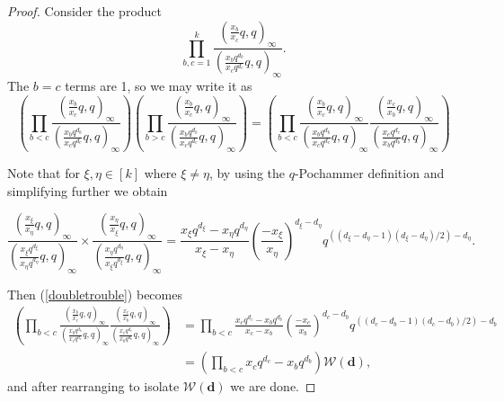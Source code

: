 \documentclass[12pt]{article}
\theoremstyle{plain}
\theoremstyle{definition}
\begin{document}
\begin{proof}
Consider the product
$$\prod_{b,c=1}^k\frac{\left(\frac{x_b}{x_c}q, q \right)_\infty}{\left(\frac{x_bq^{d_b}}{x_cq^{d_c}}q,q\right)_\infty}.$$
The $b=c$ terms are 1, so we may write it as 
\begin{equation}\label{doubletrouble}
    \left(\prod_{b<c} \frac{\left(\frac{x_b}{x_c}q, q \right)_\infty}{\left(\frac{x_bq^{d_b}}{x_cq^{d_c}}q,q\right)_\infty}\right)\left(\prod_{b>c} \frac{\left(\frac{x_b}{x_c}q, q \right)_\infty}{\left(\frac{x_bq^{d_b}}{x_cq^{d_c}}q,q\right)_\infty}\right)=\left(\prod_{b<c} \frac{\left(\frac{x_b}{x_c}q, q \right)_\infty}{\left(\frac{x_bq^{d_b}}{x_cq^{d_c}}q,q\right)_\infty}\frac{\left(\frac{x_c}{x_b}q, q \right)_\infty}{\left(\frac{x_cq^{d_c}}{x_bq^{d_b}}q,q\right)_\infty}\right)
    \end{equation}

Note that for $\xi,\eta \in [k]$ where $\xi \neq \eta$, by using the $q$-Pochammer definition and simplifying further we obtain
    
    $$ \frac{\left(\frac{x_\xi}{x_\eta}q, q \right)_\infty}{\left(\frac{x_\xi q^{d_\xi}}{x_\eta q^{d_\eta}}q,q\right)_\infty}\times \frac{\left(\frac{x_\eta}{x_\xi}q, q \right)_\infty}{\left(\frac{x_\eta q^{d_\eta}}{x_\xi q^{d_\xi}}q,q\right)_\infty}= \frac{x_\xi q^{d_\xi}-x_\eta q^{d_\eta}}{x_\xi-x_{\eta}} \left(\frac{- x_\xi}{x_\eta}\right)^{d_\xi-d_\eta} q^{((d_\xi - d_\eta -1)(d_\xi - d_\eta)/2)-d_\eta}.$$
    
Then (\ref{doubletrouble}) becomes
\begin{align*}
    \left(\prod_{b<c} \frac{\left(\frac{x_b}{x_c}q, q \right)_\infty}{\left(\frac{x_bq^{d_b}}{x_cq^{d_c}}q,q\right)_\infty}\frac{\left(\frac{x_c}{x_b}q, q \right)_\infty}{\left(\frac{x_cq^{d_c}}{x_bq^{d_b}}q,q\right)_\infty}\right) &= \prod_{b<c} \frac{x_cq^{d_c}-x_b q^{d_b}}{x_c-x_{b}} \left(\frac{- x_c}{x_b}\right)^{d_c-d_b} q^{((d_c- d_b -1)(d_c- d_b)/2)-d_b}\\
    &= \left(\prod_{b<c} x_cq^{d_c}-x_b q^{d_b}\right) \mathcal{W}(\boldsymbol{d}),
\end{align*}
and after rearranging to isolate $\mathcal{W}(\boldsymbol{d})$ we are done.
\end{proof}
\end{document}
